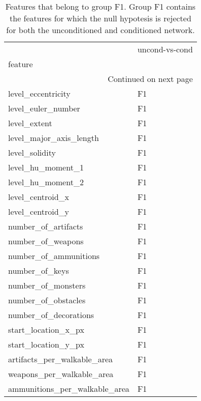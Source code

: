 \begin{longtable}{ll}
	\caption[Features belonging to the F1 group]{ \small Features that belong to group F1. Group F1 contains the features for which the null hypotesis is rejected for both the unconditioned and conditioned network.}\\
	\toprule
	{} & uncond-vs-cond \\
	feature                       &                \\
	\midrule
	\endhead
	\midrule
	\multicolumn{3}{r}{{Continued on next page}} \\
	\midrule
	\endfoot
	
	\bottomrule
	\endlastfoot
	level\_eccentricity            &             F1 \\
	level\_euler\_number            &             F1 \\
	level\_extent                  &             F1 \\
	level\_major\_axis\_length       &             F1 \\
	level\_solidity                &             F1 \\
	level\_hu\_moment\_1             &             F1 \\
	level\_hu\_moment\_2             &             F1 \\
	level\_centroid\_x              &             F1 \\
	level\_centroid\_y              &             F1 \\
	number\_of\_artifacts           &             F1 \\
	number\_of\_weapons             &             F1 \\
	number\_of\_ammunitions         &             F1 \\
	number\_of\_keys                &             F1 \\
	number\_of\_monsters            &             F1 \\
	number\_of\_obstacles           &             F1 \\
	number\_of\_decorations         &             F1 \\
	start\_location\_x\_px           &             F1 \\
	start\_location\_y\_px           &             F1 \\
	artifacts\_per\_walkable\_area   &             F1 \\
	weapons\_per\_walkable\_area     &             F1 \\
	ammunitions\_per\_walkable\_area &             F1 \\

\end{longtable}
